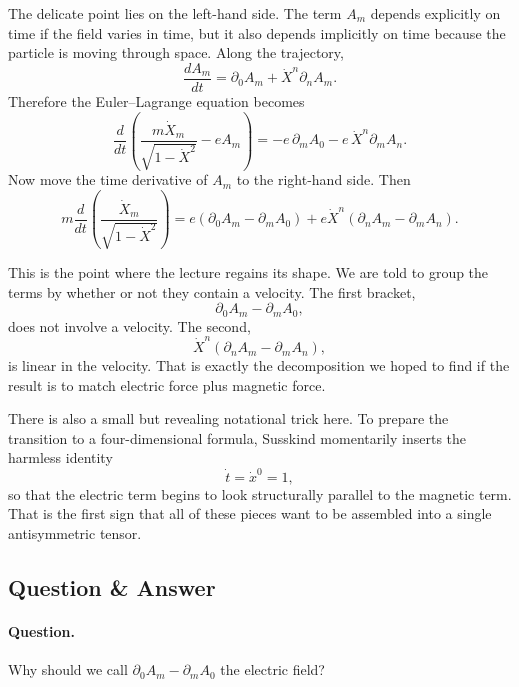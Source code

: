 The delicate point lies on the left-hand side. The term $A_m$ depends explicitly on time if the field varies in time, but it also depends implicitly on time because the particle is moving through space. Along the trajectory,
\begin{equation}
\frac{dA_m}{dt}
=
\partial_0A_m+\dot X^n\partial_nA_m.
\end{equation}
Therefore the Euler--Lagrange equation becomes
\begin{equation}
\frac{d}{dt}\left(\frac{m\dot X_m}{\sqrt{1-\dot X^2}}-eA_m\right)
=
-e\,\partial_m A_0-e\,\dot X^n\partial_m A_n.
\end{equation}
Now move the time derivative of $A_m$ to the right-hand side. Then
\begin{equation}
m\frac{d}{dt}\left(\frac{\dot X_m}{\sqrt{1-\dot X^2}}\right)
=
e(\partial_0A_m-\partial_mA_0)
+
e\dot X^n(\partial_nA_m-\partial_mA_n).
\end{equation}

This is the point where the lecture regains its shape. We are told to group the terms by whether or not they contain a velocity. The first bracket,
\begin{equation}
\partial_0A_m-\partial_mA_0,
\end{equation}
does not involve a velocity. The second,
\begin{equation}
\dot X^n(\partial_nA_m-\partial_mA_n),
\end{equation}
is linear in the velocity. That is exactly the decomposition we hoped to find if the result is to match electric force plus magnetic force.

There is also a small but revealing notational trick here. To prepare the transition to a four-dimensional formula, Susskind momentarily inserts the harmless identity
\[
\dot t=\dot x^0=1,
\]
so that the electric term begins to look structurally parallel to the magnetic term. That is the first sign that all of these pieces want to be assembled into a single antisymmetric tensor.

\subsection{Question \& Answer}

\paragraph{Question.} Why should we call $\partial_0A_m-\partial_mA_0$ the electric field?

